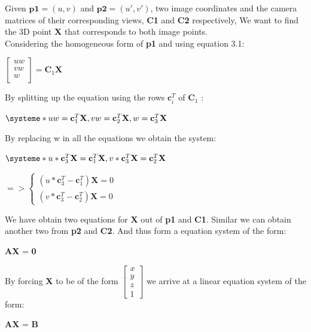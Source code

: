 \documentclass[12pt,a4paper,twoside,openright]{report}
\begin{document}
Given $\textbf{p1}=(u, v)$ and $\textbf{p2}=(u', v')$, two image coordinates and the camera matrices of their corresponding views, \textbf{C1} and \textbf{C2} respectively, We want to find the 3D point \textbf{X} that corresponds to both image points.\\
\linebreak
Considering the homogeneous form of \textbf{p1} and using equation 3.1: \\
\begin{center}
$\begin{bmatrix}
	uw \\
	vw \\
	w \\
  \end{bmatrix} = \textbf{C}_{1}\textbf{X}$
\end{center}

By splitting up the equation using the rows $\textbf{c}_{i}^T$ of $\textbf{C}_{1}$ :

\begin{center}
$\systeme*{
uw = \textbf{c}_{1}^T \textbf{X},
vw = \textbf{c}_{2}^T \textbf{X},
w = \textbf{c}_{3}^T  \textbf{X}}$
\end{center}

By replacing w in all the equations we obtain the system:
\begin{center}
$\systeme*{
u * \textbf{c}_{3}^T \textbf{X} = \textbf{c}_{1}^T \textbf{X},
v * \textbf{c}_{3}^T \textbf{X} = \textbf{c}_{2}^T \textbf{X}}$ \\
\end{center}
\begin{center}
$ => \begin{cases}
(u * \mathbf{c}_{3}^T - \mathbf{c}_{1}^T) \mathbf{X} = 0  \\
(v * \textbf{c}_{3}^T - \mathbf{c}_{2}^T) \mathbf{X} = 0
\end{cases}$
\end{center}

We have obtain two equations for \textbf{X} out of \textbf{p1} and \textbf{C1}. Similar we can obtain another two from \textbf{p2} and \textbf{C2}. And thus form a equation system of the form:
\begin{center}
	\textbf{A}\textbf{X} = \textbf{0} 
\end{center}

By forcing \textbf{X} to be of the form 
$\begin{bmatrix}
x \\
y \\
z \\
1
\end{bmatrix}$ we arrive at a linear equation system of the form:
\begin{center}
	\textbf{A}\textbf{X} = \textbf{B}
\end{center}
\end{document}
